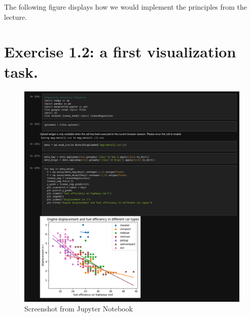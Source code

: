 \documentclass[a4paper]{article}
\begin{document}
    The following figure displays how we would implement the principles from the lecture.
    

    \clearpage

    \section{Exercise 1.2: a first visualization task.}
    \FloatBarrier
    \begin{figure}[!ht]
        \centering
        \includegraphics[width=\textwidth,height=\textheight,keepaspectratio]{./attachments/VisZettel1-export}
        \caption{Screenshot from Jupyter Notebook}
    \end{figure}
\end{document}
